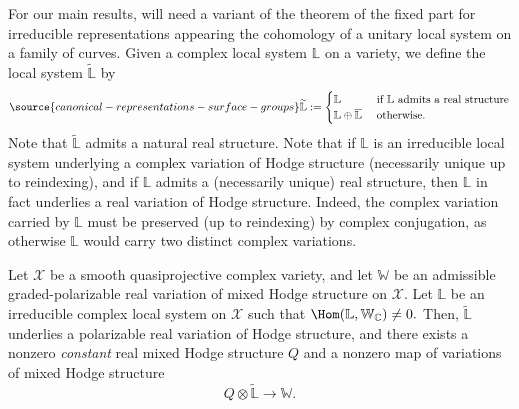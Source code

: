 For our main results, will need a variant of the theorem of the fixed part for irreducible representations appearing
the cohomology of a unitary local system on a family of curves.
Given a complex local system $\mathbb L$ on a variety, we define the local system
$\widetilde{\mathbb L}$ by
\begin{align}
	\label{equation:real-construction}
\source{canonical-representations-surface-groups}
	\widetilde{\mathbb L} :=
	\begin{cases}
		\mathbb L & \text{ if $\mathbb L$ admits a real structure}  \\
		\mathbb L \oplus \overline{\mathbb L} & \text{ otherwise.}  \\
	\end{cases}
\end{align}
Note that $\widetilde{\mathbb L}$ admits a natural real structure. Note that if $\mathbb{L}$ is an irreducible local system underlying a complex variation of Hodge structure (necessarily unique up to reindexing), and if $\mathbb{L}$ admits a (necessarily unique) real structure, then $\mathbb{L}$ in fact underlies a real variation of Hodge structure. Indeed, the complex variation carried by $\mathbb{L}$ must be preserved (up to reindexing) by complex conjugation, as otherwise $\mathbb{L}$ would carry two distinct complex variations.
\begin{proposition}
\notready\label{proposition:subrep-real-variation}
	Let $\mathscr{X}$ be a smooth quasiprojective complex variety, and let $\mathbb{W}$ be an admissible graded-polarizable real variation of mixed Hodge structure on $\mathscr{X}$. Let $\mathbb{L}$ be an irreducible complex local system on $\mathscr{X}$ such that $\Hom(\mathbb{L}, \mathbb{W}_\mathbb{C})\not = 0.$
	Then, $\widetilde{\mathbb L}$ underlies a polarizable real variation of Hodge structure, and there exists a nonzero \emph{constant} real  mixed Hodge structure $Q$ and a nonzero map of variations of mixed Hodge structure $$Q\otimes \widetilde{\mathbb{L}}\to \mathbb{W}.$$
	\end{proposition}

